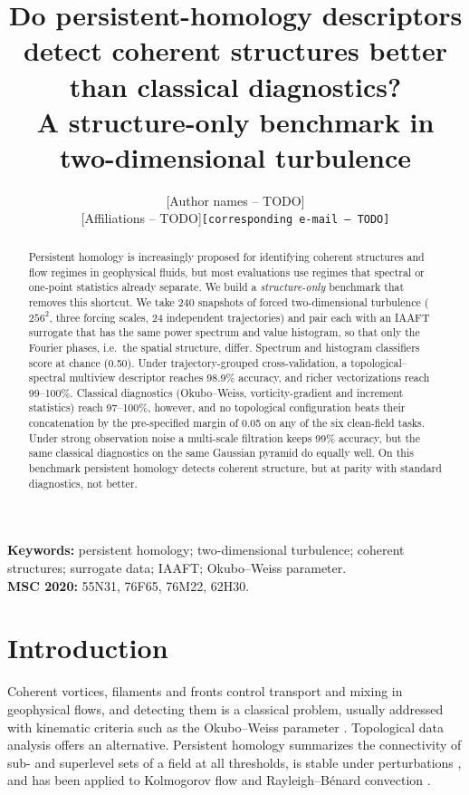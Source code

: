 \documentclass[11pt,a4paper]{article}
\title{Do persistent-homology descriptors detect coherent structures better
than classical diagnostics?\\ A structure-only benchmark in two-dimensional
turbulence}
\author{[Author names -- TODO]\\
\small [Affiliations -- TODO]\quad \texttt{[corresponding e-mail -- TODO]}}
\date{}
\begin{document}
\maketitle

\begin{abstract}
Persistent homology is increasingly proposed for identifying coherent
structures and flow regimes in geophysical fluids, but most evaluations use
regimes that spectral or one-point statistics already separate. We build a
\emph{structure-only} benchmark that removes this shortcut. We take 240
snapshots of forced two-dimensional turbulence ($256^2$, three forcing scales,
24 independent trajectories) and pair each with an IAAFT surrogate that has
the same power spectrum and value histogram, so that only the Fourier phases,
i.e.\ the spatial structure, differ. Spectrum and histogram classifiers score
at chance (0.50). Under trajectory-grouped cross-validation, a
topological--spectral multiview descriptor reaches 98.9\% accuracy, and richer
vectorizations reach 99--100\%. Classical diagnostics (Okubo--Weiss,
vorticity-gradient and increment statistics) reach 97--100\%, however, and no
topological configuration beats their concatenation by the pre-specified
margin of 0.05 on any of the six clean-field tasks. Under strong observation noise a multi-scale
filtration keeps 99\% accuracy, but the same classical diagnostics on the same
Gaussian pyramid do equally well. On this benchmark persistent homology
detects coherent structure, but at parity with standard diagnostics, not
better.
\end{abstract}

\noindent\textbf{Keywords:} persistent homology; two-dimensional turbulence;
coherent structures; surrogate data; IAAFT; Okubo--Weiss parameter.\\
\textbf{MSC 2020:} 55N31, 76F65, 76M22, 62H30. %

\section{Introduction}

Coherent vortices, filaments and fronts control transport and mixing in
geophysical flows, and detecting them is a classical problem, usually
addressed with kinematic criteria such as the Okubo--Weiss parameter
\cite{okubo1970,weiss1991,isern2006}. Topological data analysis offers an
alternative. Persistent homology summarizes the connectivity of sub- and
superlevel sets of a field at all thresholds, is stable under perturbations
\cite{edelsbrunner2010,cohensteiner2007}, and has been applied to Kolmogorov
flow and Rayleigh--B\'enard convection \cite{kramar2016}.
\end{document}
